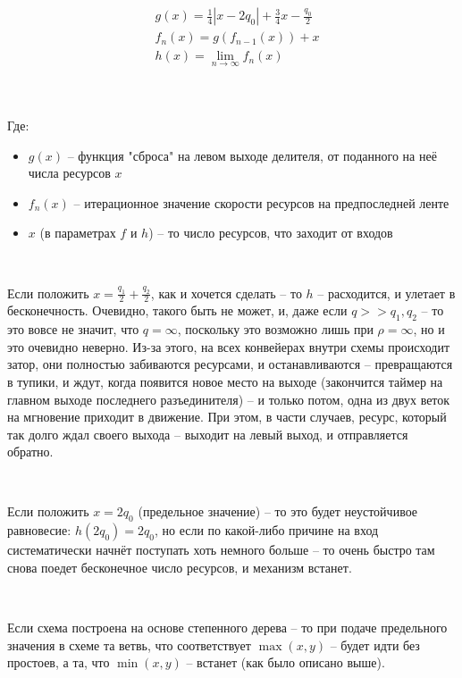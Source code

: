 \begin{align*}
	&g(x) = \frac14 \left| x-2q_0 \right| + \frac34 x - \frac{q_0}2\\
	&f_n(x) = g(f_{n-1}(x)) + x\\
	&h(x) = \lim_{n\to\infty} f_n(x)\\
\end{align*}

\

\noindent Где: 

\begin{itemize}
	\item $g(x)$ -- функция "сброса" на левом выходе делителя, от поданного на неё числа ресурсов $x$
	
	\item $f_n(x)$ -- итерационное значение скорости ресурсов на предпоследней ленте
	
	\item $x$ (в параметрах $f$ и $h$) -- то число ресурсов, что заходит от входов
\end{itemize}

\

Если положить $x = \frac{q_1}{2} + \frac{q_2}{2}$, как и хочется сделать -- то $h$ -- расходится, и улетает в бесконечность. Очевидно, такого быть не может, и, даже если $q >> q_1, q_2$ -- то это вовсе не значит, что $q = \infty$, поскольку это возможно лишь при $\rho = \infty$, но и это очевидно неверно. Из-за этого, на всех конвейерах внутри схемы происходит затор, они полностью забиваются ресурсами, и останавливаются -- превращаются в тупики, и ждут, когда появится новое место на выходе (закончится таймер на главном выходе последнего разъединителя) -- и только потом, одна из двух веток на мгновение приходит в движение. При этом, в части случаев, ресурс, который так долго ждал своего выхода -- выходит на левый выход, и отправляется обратно.

\

Если положить $x = 2q_0$ (предельное значение) -- то это будет неустойчивое равновесие: $h(2q_0) = 2q_0$, но если по какой-либо причине на вход систематически начнёт поступать хоть немного больше -- то очень быстро там снова поедет бесконечное число ресурсов, и механизм встанет.

\

Если схема построена на основе степенного дерева -- то при подаче предельного значения в схеме та ветвь, что соответствует $\max(x, y)$ -- будет идти без простоев, а та, что $\min(x, y)$ -- встанет (как было описано выше).

